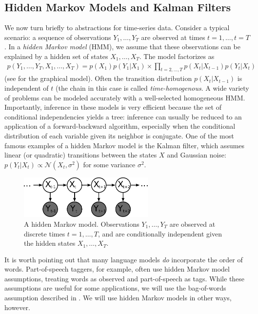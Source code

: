 \subsection{Hidden Markov Models and Kalman Filters}
We now turn briefly to abstractions for time-series data.  Consider a
typical scenario: a sequence of observations $Y_1, \ldots, Y_T$ are
observed at times $t=1, \ldots, t=T$.  In a \emph{hidden Markov model}
(HMM), we assume that these observations can be explained by a hidden set of states $X_1, \ldots, X_T$.  The model factorizes as
\begin{align}
  p(Y_1, \ldots, Y_T, X_1, \ldots, X_T) = p(X_1) p(Y_1 | X_1) \times \prod_{t=2, \ldots, T} p(X_t | X_{t-1}) p(Y_t | X_t)
\end{align}
(see  for the graphical model).  Often the transition
distribution $p(X_t | X_{t-1})$ is independent of $t$ (the chain in
this case is called \emph{time-homogenous}.  A wide variety of
problems can be modeled accurately with a well-selected homogeneous
HMM.  Importantly, inference in these models is very efficient because
the set of conditional independencies yields a tree: inference can
usually be reduced to an application of a forward-backward algorithm,
especially when the conditional distribution of each variable given
its neighbor is conjugate.  One of the most famous examples of a
hidden Markov model is the Kalman filter, which assumes linear (or
quadratic) transitions between the states $X$ and Gaussian noise:
$p(Y_t | X_t) \propto \mathcal{N}(X_t, \sigma^2)$ for some variance
$\sigma^2$.
\begin{figure}
  \begin{center}
  \includegraphics[width=0.6\textwidth]{chapter_introductory_material/figs/hmm_gm.pdf}
  \end{center}
  \caption{A hidden Markov model.  Observations $Y_1, \ldots, Y_T$ are observed at discrete times $t=1, \ldots, T$, and are conditionally independent given the hidden states $X_1, \ldots, X_T$.}
  \label{figure:hmm_gm}
\end{figure}

It is worth pointing out that many language models \emph{do}
incorporate the order of words.  Part-of-speech taggers, for example,
often use hidden Markov model assumptions, treating words as observed
and part-of-speech as tags.  While these assumptions are useful for
some applications, we will use the bag-of-words assumption described
in . We will use hidden Markov models in other ways,
however.

